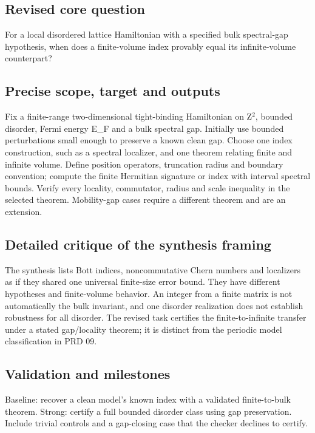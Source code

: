 \documentclass[
  11pt,
]{article}
\begin{document}
\subsection{Revised core question}

For a local disordered lattice Hamiltonian with a specified bulk
spectral-gap hypothesis, when does a finite-volume index provably equal
its infinite-volume counterpart?

\subsection{Precise scope, target and outputs}

Fix a finite-range two-dimensional tight-binding Hamiltonian on
Z\ensuremath{{}^{2}}, bounded disorder, Fermi energy E\_F and a bulk
spectral gap. Initially use bounded perturbations small enough to
preserve a known clean gap. Choose one index construction, such as a
spectral localizer, and one theorem relating finite and infinite volume.
Define position operators, truncation radius and boundary convention;
compute the finite Hermitian signature or index with interval spectral
bounds. Verify every locality, commutator, radius and scale inequality
in the selected theorem. Mobility-gap cases require a different theorem
and are an extension.

\subsection{Detailed critique of the synthesis framing}

The synthesis lists Bott indices, noncommutative Chern numbers and
localizers as if they shared one universal finite-size error bound. They
have different hypotheses and finite-volume behavior. An integer from a
finite matrix is not automatically the bulk invariant, and one disorder
realization does not establish robustness for all disorder. The revised
task certifies the finite-to-infinite transfer under a stated
gap/locality theorem; it is distinct from the periodic model
classification in PRD 09.

\subsection{Validation and milestones}

Baseline: recover a clean model's known index with a validated
finite-to-bulk theorem. Strong: certify a full bounded disorder class
using gap preservation. Include trivial controls and a gap-closing case
that the checker declines to certify.
\end{document}
